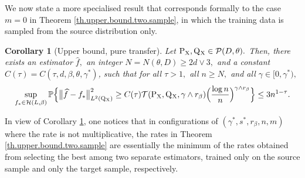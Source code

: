 \documentclass[10pt]{article}
\newcommand{\mH}{\mathcal{H}}
\newcommand{\mP}{\mathcal{P}}
\newcommand{\mT}{\mathcal{T}}
\newcommand{\PP}{\mathbb{P}}
\renewcommand{\P}{\operatorname{P}}
\newcommand{\Q}{\operatorname{Q}}
\newcommand{\wh}{\widehat}
\newcommand{\sX}{\mathrm{X}}
\newtheorem{corollary}[theorem]{Corollary}
\begin{document}
We now state a more specialised result that corresponds formally to the case $m = 0$ in Theorem \ref{th.upper.bound.two.sample}, in which the training data is sampled from the source distribution only.
\begin{corollary}[Upper bound, pure transfer]
    \label{cor.upper.bound.one.sample.P}
    Let $\P_{\sX}, \Q\mathstrut_{\!\sX} \in \mP(D, \theta).$ Then, there exists an estimator $\wh f,$ an integer $N = N(\theta, D) \geq 2d\vee 3,$ and a constant $C(\tau) = C(\tau, d, \beta, \theta, \gamma^*)$, such that for all $\tau > 1,$ all $n \geq N,$ and all $\gamma \in [0, \gamma^*),$
    \begin{align*}
        \sup_{f_* \in \mH(L, \beta)}\PP\Big\{\big\|\wh f - f_*\big\|_{L^2(\Q\mathstrut_{\!\sX})}^2 \geq C(\tau)\mT(\P_{\sX}, \Q\mathstrut_{\!\sX}, \gamma\wedge r_\beta)\Big(\frac{\log n}{n}\Big)^{\gamma \wedge r_\beta}\Big\} \leq 3n^{1-\tau}.
    \end{align*}
\end{corollary}
In view of Corollary \ref{cor.upper.bound.one.sample.P}, one notices that in configurations of $(\gamma^*, s^*, r_\beta, n, m)$ where the rate is not multiplicative, the rates in Theorem \ref{th.upper.bound.two.sample} are essentially the minimum of the rates obtained from selecting the best among two separate estimators, trained only on the source sample and only the target sample, respectively.\\
\end{document}
